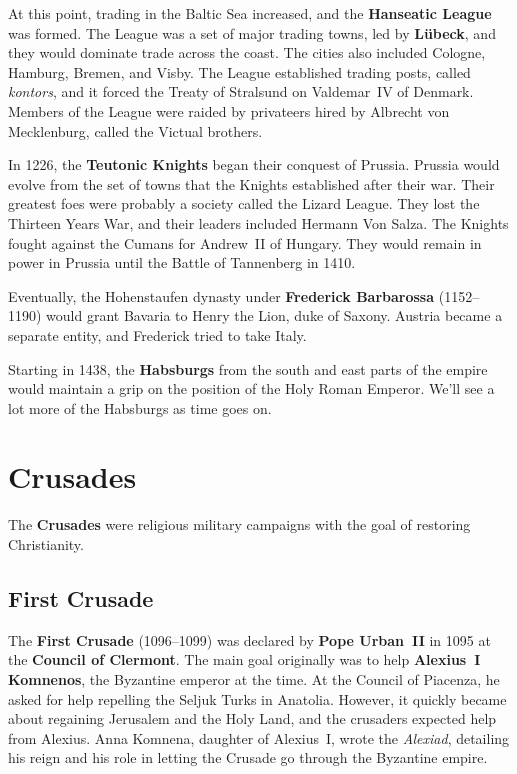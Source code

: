 At this point, trading in the Baltic Sea increased, and the \textbf{Hanseatic League} was formed.
The League was a set of major trading towns, led by \textbf{L\"ubeck}, and they would dominate trade across the coast.
The cities also included Cologne, Hamburg, Bremen, and Visby.
The League established trading posts, called \textit{kontors},
and it forced the Treaty of Stralsund on Valdemar~IV of Denmark.
Members of the League were raided by privateers hired by Albrecht von Mecklenburg, called the Victual brothers.

In 1226, the \textbf{Teutonic Knights} began their conquest of Prussia.
Prussia would evolve from the set of towns that the Knights established after their war.
Their greatest foes were probably a society called the Lizard League.
They lost the Thirteen Years War, and their leaders included Hermann Von Salza.
The Knights fought against the Cumans for Andrew~II of Hungary.
They would remain in power in Prussia until the Battle of Tannenberg in 1410.

Eventually, the Hohenstaufen dynasty under \textbf{Frederick Barbarossa} (1152--1190)
would grant Bavaria to Henry the Lion, duke of Saxony.
Austria became a separate entity, and Frederick tried to take Italy.

Starting in 1438, the \textbf{Habsburgs} from the south and east parts of the empire
would maintain a grip on the position of the Holy Roman Emperor.
We'll see a lot more of the Habsburgs as time goes on.

\section{Crusades}

The \textbf{Crusades} were religious military campaigns with the goal of restoring Christianity.

\subsection*{First Crusade}

The \textbf{First Crusade} (1096--1099) was declared by \textbf{Pope Urban~II} in 1095
at the \textbf{Council of Clermont}.
The main goal originally was to help \textbf{Alexius~I Komnenos}, the Byzantine emperor at the time.
At the Council of Piacenza, he asked for help repelling the Seljuk Turks in Anatolia.
However, it quickly became about regaining Jerusalem and the Holy Land,
and the crusaders expected help from Alexius.
Anna Komnena, daughter of Alexius~I, wrote the \textit{Alexiad},
detailing his reign and his role in letting the Crusade go through the Byzantine empire.


